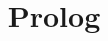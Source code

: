 \documentclass[12pt,titlepage]{article}
\begin{document}


\pagestyle{fancy}
\renewcommand{\sectionmark}[1]{\markboth{}{\thesection\ \ #1}}
\lhead{}
\chead{}
\rhead{\rightmark}
\lfoot{}
\cfoot{}
\rfoot{\thepage}



\title{Prolog}
\author{}


\end{document}
